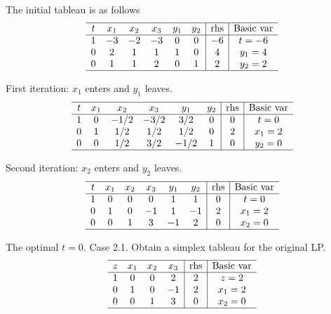 \documentclass[12pt]{article}
\begin{document}
The initial tableau is as follows
\begin{equation*}
  \begin{array}{cccccc|c|c}
    \hline
    t &  x_1      &  x_2 &  x_3 &  y_1 & y_2 &   \text{rhs} & \text{Basic var}  \\ \hline
    1 &    -3      &    -2 &    -3 &    0 & 0    & -6        &  t=-6              \\
    0 &    2      &    1 &    1 &    1 &    0 & 4        &  y_1 = 4          \\
    0 &    1      &    1 &    2 &    0 &    1 & 2        &  y_2 = 2          \\ \hline
  \end{array}
\end{equation*}

First iteration: $x_1$ enters and $y_1$ leaves.
\begin{equation*}
  \begin{array}{cccccc|c|c}
    \hline
    t &  x_1      &  x_2 &  x_3 &  y_1 & y_2 &   \text{rhs} & \text{Basic var}  \\ \hline
    1 &    0      &    -1/2 &    -3/2 &    3/2 & 0    & 0        &  t=0              \\
    0 &    1      &    1/2 &    1/2 &    1/2 &    0 & 2        &  x_1 = 2          \\
    0 &    0      &    1/2 &    3/2 &   -1/2 &    1 & 0        &  y_2 = 0          \\ \hline
  \end{array}
\end{equation*}

Second iteration: $x_2$ enters and $y_2$ leaves.
\begin{equation*}
  \begin{array}{cccccc|c|c}
    \hline
    t &  x_1      &  x_2 &  x_3 &  y_1 & y_2 &   \text{rhs} & \text{Basic var}  \\ \hline
    1 &    0      &    0   &    0     &    1   & 1    & 0        &  t=0              \\
    0 &    1      &    0   &    -1    &    1   &   -1 & 2        &  x_1 = 2          \\
    0 &    0      &    1   &    3     &   -1   &    2 & 0        &  x_2 = 0          \\ \hline
  \end{array}
\end{equation*}

The optimal $t=0$. Case 2.1. Obtain a simplex tableau for the original LP.
\begin{equation*}
  \begin{array}{cccc|c|c}
    \hline
    z &  x_1      &  x_2   &  x_3       &   \text{rhs} & \text{Basic var}  \\ \hline
    1 &    0      &    0   &    2       & 2            &  z=2              \\
    0 &    1      &    0   &    -1      & 2            &  x_1 = 2          \\
    0 &    0      &    1   &    3       & 0            &  x_2 = 0          \\ \hline
  \end{array}
\end{equation*}
\end{document}
